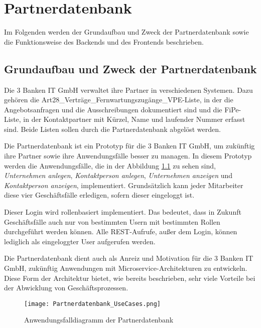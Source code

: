 \chapter{Partnerdatenbank}
Im Folgenden werden der Grundaufbau und Zweck der Partnerdatenbank sowie die Funktionsweise des Backends und des Frontends beschrieben.

\section{Grundaufbau und Zweck der Partnerdatenbank}
Die 3 Banken IT GmbH verwaltet ihre Partner in verschiedenen Systemen. Dazu gehören die Art28\_Verträge\_Fernwartungszugänge\_VPE-Liste, in der die Angebotsanfragen und die Ausschreibungen dokumentiert sind und die FiPe-Liste, in der Kontaktpartner mit Kürzel, Name und laufender Nummer erfasst sind. Beide Listen sollen durch die Partnerdatenbank abgelöst werden.

Die Partnerdatenbank ist ein Prototyp für die 3 Banken IT GmbH, um zukünftig ihre Partner sowie ihre Anwendungsfälle besser zu managen. In diesem Prototyp werden die Anwendungsfälle, die  in der Abbildung \ref{fig:UseCaseDiagramm} zu sehen sind, \textit{Unternehmen anlegen}, \textit{Kontaktperson anlegen}, \textit{Unternehmen anzeigen} und \textit{Kontaktperson anzeigen}, implementiert.
Grundsätzlich kann jeder Mitarbeiter diese vier Geschäftsfälle erledigen, sofern dieser eingeloggt ist.

Dieser Login wird rollenbasiert implementiert. Das bedeutet, dass in Zukunft Geschäftsfälle auch nur von bestimmten Usern mit bestimmten Rollen durchgeführt werden können.
Alle REST-Aufrufe, außer dem Login, können lediglich als eingeloggter User aufgerufen werden.

Die Partnerdatenbank dient auch als Anreiz und Motivation für die 3 Banken IT GmbH, zukünftig Anwendungen mit Microservice-Architekturen zu entwickeln. Diese Form der Architektur bietet, wie bereits beschrieben, sehr viele Vorteile bei der Abwicklung von Geschäftsprozessen.

\begin{figure}[h]
	\begin{center}
		\texttt{[image: Partnerdatenbank\_UseCases.png]}
		\caption[Anwendungsfalldiagramm der Partnerdatenbank]{Anwendungsfalldiagramm der Partnerdatenbank}
		\label{fig:UseCaseDiagramm}
	\end{center}
\end{figure}


